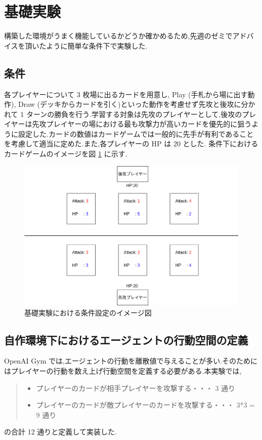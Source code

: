 \documentclass{jarticle}     %
\begin{document}
\section{基礎実験}
構築した環境がうまく機能しているかどうか確かめるため,先週のゼミでアドバイスを頂いたように簡単な条件下で実験した.

\subsection{条件}

各プレイヤーについて 3 枚場に出るカードを用意し, Play (手札から場に出す動作), Draw (デッキからカードを引く)といった動作を考慮せず先攻と後攻に分かれて 1 ターンの勝負を行う.学習する対象は先攻のプレイヤーとして,後攻のプレイヤーは先攻プレイヤーの場における最も攻撃力が高いカードを優先的に狙うように設定した.カードの数値はカードゲームでは一般的に先手が有利であることを考慮して適当に定めた.また,各プレイヤーの HP は 20 とした.
条件下におけるカードゲームのイメージを図 \ref{fig:Figure1} に示す.

\begin{figure}[htbp]
  \centering
  \includegraphics[width=150mm]{assets/Figure1.eps}
  \caption{基礎実験における条件設定のイメージ図}
  \label{fig:Figure1}
\end{figure}

\subsection{自作環境下におけるエージェントの行動空間の定義}
OpenAI Gym では,エージェントの行動を離散値で与えることが多い.そのためにはプレイヤーの行動を数え上げ行動空間を定義する必要がある.本実験では,
\begin{quote}
  \begin{itemize}
   \item プレイヤーのカードが相手プレイヤーを攻撃する・・・ 3 通り
   \item プレイヤーのカードが敵プレイヤーのカードを攻撃する・・・ 3*3 = 9 通り
  \end{itemize}
 \end{quote}
の合計 12 通りと定義して実装した.
\end{document}

